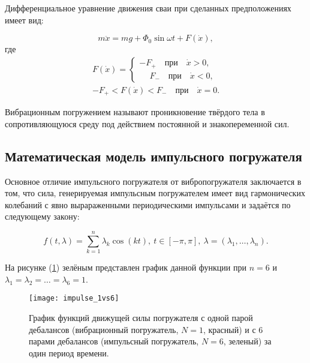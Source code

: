 Дифференциальное уравнение движения сваи при сделанных предположениях имеет вид:

\begin{equation}
    m\ddot{x} = mg + \Phi_0 \sin \omega t + F(\dot{x}),
\end{equation}
где
\begin{equation}
    \begin{aligned}
        F(\dot{x}) =
        \begin{cases}
            -F_+ \quad \text{при} \quad \dot{x} > 0,\\
            \phantom{-}F_- \quad \text{при} \quad \dot{x} < 0,
        \end{cases}\\
        -F_+ < F(\dot{x}) < F_- \quad \text{при} \quad \dot{x} = 0.
    \end{aligned}
\end{equation}

\begin{definition}
    Вибрационным погружением называют проникновение твёрдого тела в сопротивляющуюся среду
    под действием постоянной и знакопеременной сил.
\end{definition}

\subsection{Математическая модель импульсного погружателя}

Основное отличие импульсного погружателя от вибропогружателя заключается в том, что сила, генерируемая
импульсным погружателем имеет вид гармонических колебаний с явно вырараженными периодическими импульсами и задаётся
по следующему закону:

\begin{equation}
    f(t,\lambda)=\sum_{k=1}^n \lambda_k\cos(kt),\ t\in [-\pi,\pi],\ \lambda =(\lambda_1, \ldots,\lambda_n).
\end{equation}

\noindent На рисунке (\ref{fig:impulse_1vs6}) зелёным представлен график данной функции при $n = 6$ и
$\lambda_1 = \lambda_2 = \ldots = \lambda_6 = 1$.

\begin{figure}[ht]
    \centering
    \texttt{[image: impulse\_1vs6]}
    \caption{График функций движущей силы погружателя с одной парой дебалансов (вибрационный погружатель, $N = 1$, красный) и с 6 парами дебалансов (импульсный погружатель, $N = 6$, зеленый) за один период времени.}
    \label{fig:impulse_1vs6}
\end{figure}


